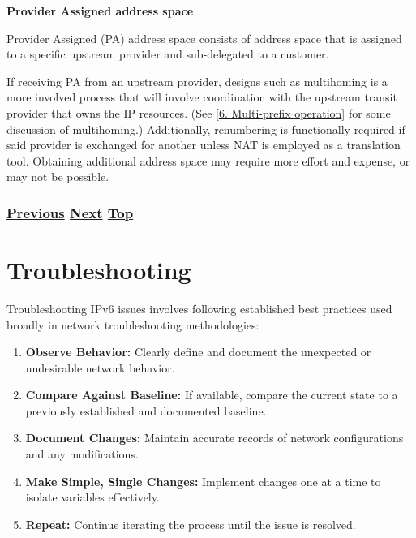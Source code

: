 \documentclass[
]{article}
\providecommand{\tightlist}{%
  \setlength{\itemsep}{0pt}\setlength{\parskip}{0pt}}
\begin{document}
\textbf{Provider Assigned address space}

Provider Assigned (PA) address space consists of address space that is
assigned to a specific upstream provider and sub-delegated to a
customer.

If receiving PA from an upstream provider, designs such as multihoming
is a more involved process that will involve coordination with the
upstream transit provider that owns the IP resources. (See
{[}\hyperref[multi-prefix-operation]{6. Multi-prefix operation}{]} for
some discussion of multihoming.) Additionally, renumbering is
functionally required if said provider is exchanged for another unless
NAT is employed as a translation tool. Obtaining additional address
space may require more effort and expense, or may not be possible.

\subsubsection{\texorpdfstring{\hyperref[deployment-in-the-home]{Previous}
\hyperref[troubleshooting]{Next}
\hyperref[deployment-status]{Top}}{Previous Next Top}}\label{previous-next-top-38}

\pagebreak

\section{Troubleshooting}\label{troubleshooting}

Troubleshooting IPv6 issues involves following established best
practices used broadly in network troubleshooting methodologies:

\begin{enumerate}
\def\labelenumi{\arabic{enumi}.}
\tightlist
\item
  \textbf{Observe Behavior:} Clearly define and document the unexpected
  or undesirable network behavior.
\item
  \textbf{Compare Against Baseline:} If available, compare the current
  state to a previously established and documented baseline.
\item
  \textbf{Document Changes:} Maintain accurate records of network
  configurations and any modifications.
\item
  \textbf{Make Simple, Single Changes:} Implement changes one at a time
  to isolate variables effectively.
\item
  \textbf{Repeat:} Continue iterating the process until the issue is
  resolved.
\end{enumerate}
\end{document}

